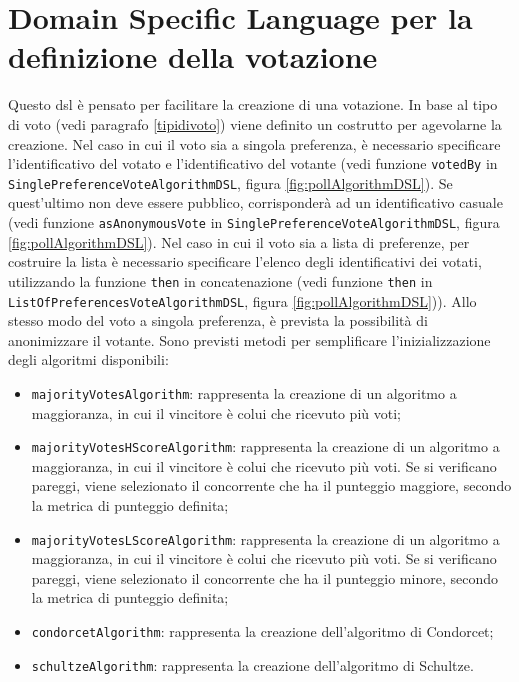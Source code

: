 \documentclass[12pt,a4paper,openright,twoside]{book}
\begin{document}
 \section{Domain Specific Language per la definizione della votazione}
 Questo \ac{dsl} è pensato per facilitare la creazione di una votazione.
 In base al tipo di voto (vedi paragrafo \ref{tipidivoto}) viene definito un costrutto
 per agevolarne la creazione.
 Nel caso in cui il voto sia a singola preferenza, è necessario specificare
 l'identificativo del votato e l'identificativo del votante (vedi funzione \texttt{votedBy} in \texttt{SinglePreferenceVoteAlgorithmDSL}, figura \ref{fig:pollAlgorithmDSL}). Se quest'ultimo non 
 deve essere pubblico, corrisponderà ad un identificativo casuale (vedi funzione \texttt{asAnonymousVote} in \texttt{SinglePreferenceVoteAlgorithmDSL}, figura \ref{fig:pollAlgorithmDSL}).
 Nel caso in cui il voto sia a lista di preferenze, per costruire la lista è necessario specificare l'elenco degli identificativi dei votati,
 utilizzando la funzione \texttt{then} in concatenazione (vedi funzione \texttt{then} in \texttt{ListOfPreferencesVoteAlgorithmDSL}, figura \ref{fig:pollAlgorithmDSL})).
 Allo stesso modo del voto a singola preferenza, è prevista la possibilità di anonimizzare il votante.
 Sono previsti metodi per semplificare l'inizializzazione degli algoritmi disponibili:
 \begin{itemize}
    \item{\texttt{majorityVotesAlgorithm}: rappresenta la creazione di un algoritmo a maggioranza, in cui il vincitore è colui che ricevuto più voti;}
    \item{\texttt{majorityVotesHScoreAlgorithm}: rappresenta la creazione di un algoritmo a maggioranza, in cui il vincitore è colui che ricevuto più voti.
    Se si verificano pareggi, viene selezionato il concorrente che ha il punteggio maggiore, secondo la metrica di punteggio definita;}
    \item{\texttt{majorityVotesLScoreAlgorithm}: rappresenta la creazione di un algoritmo a maggioranza, in cui il vincitore è colui che ricevuto più voti.
    Se si verificano pareggi, viene selezionato il concorrente che ha il punteggio minore, secondo la metrica di punteggio definita;}
    \item{\texttt{condorcetAlgorithm}: rappresenta la creazione dell'algoritmo di Condorcet;}
    \item{\texttt{schultzeAlgorithm}: rappresenta la creazione dell'algoritmo di Schultze.}
 \end{itemize}
\end{document}
